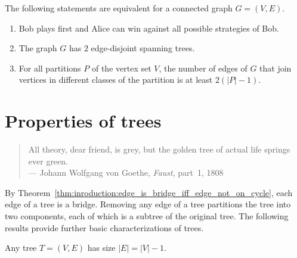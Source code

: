 \begin{theorem}
The following statements are equivalent for a connected graph
$G = (V, E)$.
\begin{enumerate}
\item Bob plays first and Alice can win against all possible
  strategies of Bob.

\item The graph $G$ has $2$ edge-disjoint spanning trees.

\item For all partitions $P$ of the vertex set $V$, the number of
  edges of $G$ that join vertices in different classes of the
  partition is at least $2(|P| - 1)$.
\end{enumerate}
\end{theorem}



\section{Properties of trees}
\label{sec:trees_forests:properties_trees}

\begin{quote}
\footnotesize
All theory, dear friend, is grey, but the golden tree of actual life
springs ever green. \\
\noindent
--- Johann Wolfgang von Goethe, \emph{Faust}, part~1, 1808
\end{quote}

\noindent
By Theorem~\ref{thm:inroduction:edge_is_bridge_iff_edge_not_on_cycle},
each edge of a tree is a bridge. Removing any edge of a
tree partitions the tree into two components, each of
which is a subtree of the original tree. The
following results provide further basic characterizations of trees.

\begin{theorem}
\label{thm:trees_forests:each_tree_has_size_n_minus_one}
Any tree $T = (V,E)$ has size $|E| = |V| - 1$.
\end{theorem}

